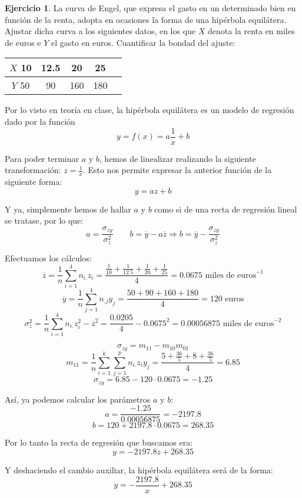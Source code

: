 \documentclass[a4paper, 12pt]{article}
\theoremstyle{definition}
\newtheorem{ej}{Ejercicio}
\begin{document}
\begin{ej}
La curva de Engel, que expresa el gasto en un determinado bien en función de la renta, adopta en ocasiones la forma de una hipérbola equilátera. Ajustar dicha curva a los siguientes datos, en los que \(X\) denota la renta en miles de euros e \(Y\) el gasto en euros. Cuantificar la bondad del ajuste:
\begin{center}
\begin{tabular}{c|cccc}
	\(X\) 10 & 12.5 & 20 & 25 \\
	\hline
	\(Y\) 50 & 90 & 160 & 180 \\
\end{tabular}
\end{center}

Por lo visto en teoría en clase, la hipérbola equilátera es un modelo de regresión dado por la función
\[
	y = f(x) = a \frac{1}{x} + b
\]

Para poder terminar \(a\) y \(b\), hemos de linealizar realizando la siguiente transformación: \(z = \frac{1}{x}\). Esto nos permite expresar la anterior función de la siguiente forma:
\[
	y = az + b
\]

Y ya, simplemente hemos de hallar \(a\) y \(b\) como si de una recta de regresión lineal se tratase, por lo que:
\[
	a = \frac{\sigma_{zy}}{\sigma_z^2} \qquad b = \overline{y} - a \overline{z} \Rightarrow b = \overline{y} - \frac{\sigma_{zy}}{\sigma_z^2}
\]

Efectuamos los cálculos:
\[
	\overline{z} = \frac{1}{n} \sum_{i=1}^{4} n_{i.} z_i = \frac{\frac{1}{10}+\frac{1}{12.5}+\frac{1}{20}+\frac{1}{25}}{4} = 0.0675 \text{ miles de euros}^{-1}
\]
\[
	\overline{y} = \frac{1}{n} \sum_{j=1}^{4} n_{.j} y_j = \frac{50 + 90 + 160 + 180}{4} = 120 \text{ euros}
\]
\[
	\sigma_z^2 = \frac{1}{n} \sum_{i=1}^{4} n_{i.} z_i^2 - \overline{z}^2 = \frac{0.0205}{4} - 0.0675^2 = 0.00056875 \text{ miles de euros}^{-2}
\]

\[
	\sigma_{zy} = m_{11} - m_{10} m_{01} 
\]
\[
	m_{11} = \frac{1}{n} \sum_{i=1}^{k} \sum_{j=1}^{p} n_{i.} z_i y_j = \frac{5 + \frac{36}{5} + 8 + \frac{36}{5}}{4} = 6.85
\]
\[
	\sigma_{zy} = 6.85 - 120 \cdot 0.0675 = -1.25
\]

Así, ya podemos calcular los parámetros \(a\) y \(b\):
\[
	a = \frac{-1.25}{0.00056875} = -2197.8
\]
\[
	b = 120 + 2197.8 \cdot 0.0675 = 268.35
\]

Por lo tanto la recta de regresión que buscamos era:
\[
	y = -2197.8z + 268.35
\]

Y deshaciendo el cambio auxiliar, la hipérbola equilátera será de la forma:
\[
	y = - \frac{2197.8}{x} + 268.35
\] \\


\end{ej}
\end{document}
